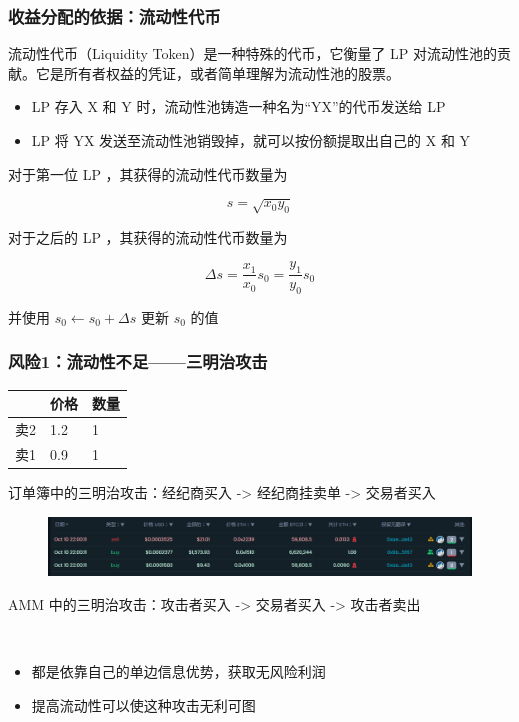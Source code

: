 \documentclass{beamer}
\begin{document}
\begin{frame}
    \frametitle{收益分配的依据：流动性代币}

    流动性代币（Liquidity Token）是一种特殊的代币，它衡量了 LP 对流动性池的贡献。它是所有者权益的凭证，或者简单理解为流动性池的股票。

    \begin{itemize}
        \item LP 存入 X 和 Y 时，流动性池铸造一种名为“YX”的代币发送给 LP 
        \item LP 将 YX 发送至流动性池销毁掉，就可以按份额提取出自己的 X 和 Y 
    \end{itemize}
    
    对于第一位 LP ，其获得的流动性代币数量为

    \begin{equation}
        s = \sqrt{x_0y_0}
    \end{equation}

    对于之后的 LP ，其获得的流动性代币数量为

    \begin{equation}
        \Delta s = \frac{x_1}{x_0} s_0 = \frac{y_1}{y_0} s_0
    \end{equation}

    并使用 $s_0 \leftarrow s_0 + \Delta s$ 更新 $s_0$ 的值
\end{frame}

\begin{frame}
    \frametitle{风险1：流动性不足——三明治攻击}

    \begin{table}[htbp]
        \centering
        \begin{tabular}{lll}
            & 价格  & 数量 \\ \hline
            卖2 & 1.2 & 1  \\ \hline
            卖1 & 0.9 & 1 
        \end{tabular}
    \end{table}

    订单簿中的三明治攻击：经纪商买入 -> 经纪商挂卖单 -> 交易者买入

    \begin{figure}
        \centering
        \includegraphics[width=\textwidth]{../notes/三明治攻击示意图.png}
    \end{figure}

    AMM 中的三明治攻击：攻击者买入 -> 交易者买入 -> 攻击者卖出

    ~

    \begin{itemize}
        \item 都是依靠自己的单边信息优势，获取无风险利润
        \item 提高流动性可以使这种攻击无利可图
    \end{itemize}
    
\end{frame}
\end{document}
